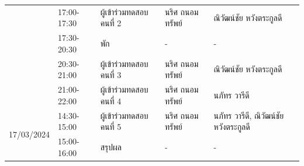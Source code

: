 \begin{enumerate}
\begin{table}[H]
\begin{tabular}{|r|l|l|l|l|}
                                                     & 17:00-17:30         & ผู้เข้าร่วมทดสอบ คนที่ 2 & นริศ ถนอมทรัพย์     & ณิวัฒน์ชัย หวังตระกูลดี            \\ \cline{2-5}
                                                     & 17:30-20:30         & พัก                 & -                & -                           \\ \cline{2-5}
                                                     & 20:30-21:00         & ผู้เข้าร่วมทดสอบ คนที่ 3 & นริศ ถนอมทรัพย์     & ณิวัฒน์ชัย หวังตระกูลดี            \\ \cline{2-5}
                                                     & 21:00-22:00         & ผู้เข้าร่วมทดสอบ คนที่ 4 & นริศ ถนอมทรัพย์     & นภัทร วารีดี                   \\ \hline
                  \multirow[t]{2}{*}{17/03/2024}     & 14:30-15:00         & ผู้เข้าร่วมทดสอบ คนที่ 5 & นริศ ถนอมทรัพย์     & นภัทร วารีดี, ณิวัฒน์ชัย หวังตระกูลดี \\ \cline{2-5}
                                                     & 15:00-16:00         & สรุปผล              & -                & -                           \\ \hline
              \end{tabular}
          \end{table}
\end{enumerate}
